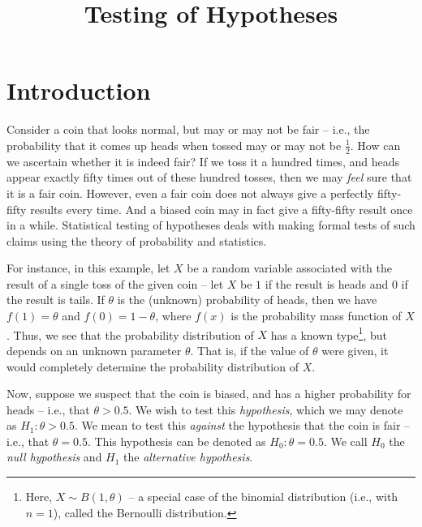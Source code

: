 \documentclass[svgnames, a5paper]{article}
\theoremstyle{definition}
\theoremstyle{remark}
\begin{document}
\title{\textbf{Testing of Hypotheses}}

\date{}
\maketitle

\begingroup
\let\clearpage\relax
\tableofcontents
\endgroup

\section{Introduction}\label{sec:Intro}

Consider a coin that looks normal, but may or may not be fair -- i.e., the probability that it comes up heads when tossed may or may not be $\frac 1 2$. How can we ascertain whether it is indeed fair? If we toss it a hundred times, and heads appear exactly fifty times out of these hundred tosses, then we may \emph{feel} sure that it is a fair coin. However, even a fair coin does not always give a perfectly fifty-fifty results every time. And a biased coin may in fact give a fifty-fifty result once in a while. Statistical testing of hypotheses deals with making formal tests of such claims using the theory of probability and statistics.

For instance, in this example, let $X$ be a random variable associated with the result of a single toss of the given coin -- let $X$ be $1$ if the result is heads and $0$ if the result is tails. If $\theta$ is the (unknown) probability of heads, then we have $f(1) = \theta$ and $f(0) = 1 - \theta$, where $f(x)$ is the probability mass function of $X$. Thus, we see that the probability distribution of $X$ has a known type\footnote{
	Here, $X \sim B(1, \theta)$ -- a special case of the binomial distribution (i.e., with $n = 1$), called the Bernoulli distribution.
}, but depends on an unknown parameter $\theta$. That is, if the value of $\theta$ were given, it would completely determine the probability distribution of $X$.

Now, suppose we suspect that the coin is biased, and has a higher probability for heads -- i.e., that $\theta > 0.5$. We wish to test this \emph{hypothesis}, which we may denote as $H_1 \colon \theta > 0.5$. We mean to test this \emph{against} the hypothesis that the coin is fair -- i.e., that $\theta = 0.5$. This hypothesis can be denoted as $H_0 \colon \theta = 0.5$. We call $H_0$ the \emph{null hypothesis} and $H_1$ the \emph{alternative hypothesis}.
\end{document}
